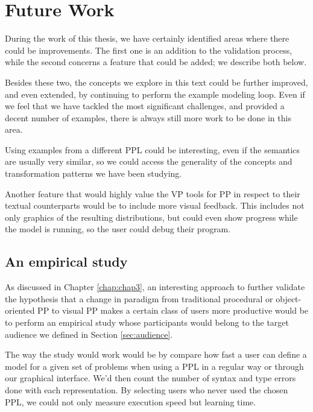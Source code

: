 \section{Future Work}

During the work of this thesis, we have certainly identified areas where there
could be improvements. The first one is an addition to the validation process, while the
second concerns a feature that could be added; we describe both below.

Besides these two, the concepts we explore in this text could be further improved,
and even extended, by continuing to perform the example modeling loop.
Even if we feel that we have tackled the most significant
challenges, and provided a decent number of examples, there is always still more
work to be done in this area.

Using examples from a different PPL could be interesting, even if the semantics
are usually very similar, so we could access the generality of the concepts
and transformation patterns we have been studying.

Another feature that would highly value the VP tools for PP in respect to their
textual counterparts would be to include more visual feedback. This includes
not only graphics of the resulting distributions, but could even show progress
while the model is running, so the user could debug their program.

\subsection{An empirical study}

As discussed in Chapter \ref{chap:chap3}, an interesting approach to further validate
the hypothesis that a change in paradigm from traditional procedural or
object-oriented PP to visual PP makes a certain class of users more productive
would be to perform an empirical study whose participants would belong to the
target audience we defined in Section \ref{sec:audience}.

The way the study would work would be by compare how fast a user can define a model for a given set of problems
when using a PPL in a regular way or through our graphical interface. We'd then
count the number of syntax and type errors done with each representation. By
selecting users who never used the chosen PPL, we could not only measure execution
speed but learning time.

